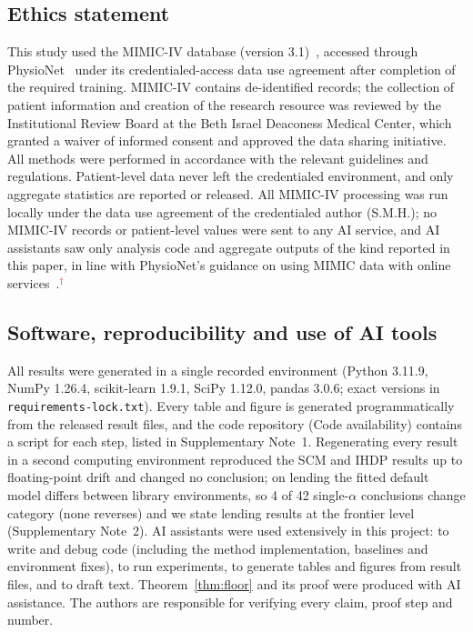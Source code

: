 \documentclass[10pt,a4paper]{article}
\newcommand{\verify}[1]{\textcolor{red}{#1$^{\dagger}$}}
\begin{document}
\subsection*{Ethics statement}
This study used the MIMIC-IV database (version 3.1)~\cite{johnson2023mimic}, accessed through
PhysioNet~\cite{goldberger2000} under its credentialed-access data use agreement after completion of
the required training. MIMIC-IV contains de-identified records; the collection of patient information and creation of the research resource was reviewed by the Institutional Review Board at the Beth Israel Deaconess Medical Center, which granted a waiver of informed consent and approved the data sharing initiative. All methods were performed in
accordance with the relevant guidelines and regulations. Patient-level data never left the
credentialed environment, and only aggregate statistics are reported or released. All MIMIC-IV processing was run locally under the data use agreement of the credentialed author (S.M.H.); no MIMIC-IV records or patient-level values were sent to any AI service, and AI assistants saw only analysis code and aggregate outputs of the kind reported in this paper, in line with PhysioNet's guidance on using MIMIC data with online services~\cite{physionet2025llm}.\verify{}

\subsection*{Software, reproducibility and use of AI tools}
All results were generated in a single recorded environment (Python 3.11.9, NumPy 1.26.4,
scikit-learn 1.9.1, SciPy 1.12.0, pandas 3.0.6; exact versions in \texttt{requirements-lock.txt}). Every
table and figure is generated programmatically from the released result files, and the code
repository (Code availability) contains a script for each step, listed in Supplementary Note~1. Regenerating every result in a second computing environment reproduced the SCM and IHDP results up to floating-point drift and changed no conclusion; on lending the fitted default model differs between library environments, so 4 of 42 single-$\alpha$ conclusions change category (none reverses) and we state lending results at the frontier level (Supplementary Note~2). AI
assistants were used extensively in this project: to write and debug code (including the method
implementation, baselines and environment fixes), to run experiments, to generate tables and figures
from result files, and to draft text. Theorem~\ref{thm:floor} and its proof were produced with AI
assistance. The authors are responsible for verifying every claim, proof step and number.
\end{document}
